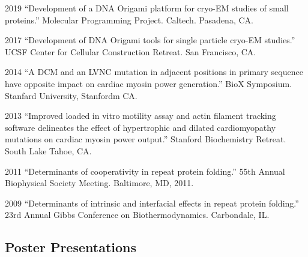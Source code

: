 \documentclass[12pt,letterpaper]{report}
\begin{document}
    \begin{tablist}

        \item[2019] \tab{}\enquote{Development of a DNA Origami platform for cryo-EM studies of small proteins.} Molecular Programming Project. Caltech. Pasadena, CA.

         \item[2017] \tab{}\enquote{Development of DNA Origami tools for single particle cryo-EM studies.} UCSF Center for Cellular Construction Retreat. San Francisco, CA. 

        \item[2014] \tab{}\enquote{A DCM and an LVNC mutation in adjacent positions in primary sequence have opposite impact on cardiac myosin power generation.} BioX Symposium. Stanfard University, Stanfordm CA.

         \item[2013] \tab{}\enquote{Improved loaded in vitro motility assay and actin filament tracking software delineates the effect of hypertrophic and dilated cardiomyopathy mutations on cardiac myosin power output.} Stanford Biochemistry Retreat. South Lake Tahoe, CA.

         \item[2011] \tab{}\enquote{Determinants of cooperativity in repeat protein folding.} 55th Annual Biophysical Society Meeting. Baltimore, MD, 2011.

         \item[2009] \tab{}\enquote{Determinants of intrinsic and interfacial effects in repeat protein folding.} 23rd Annual Gibbs Conference on Biothermodynamics. Carbondale, IL.


    \end{tablist}

    \subsection*{Poster Presentations}
\end{document}
